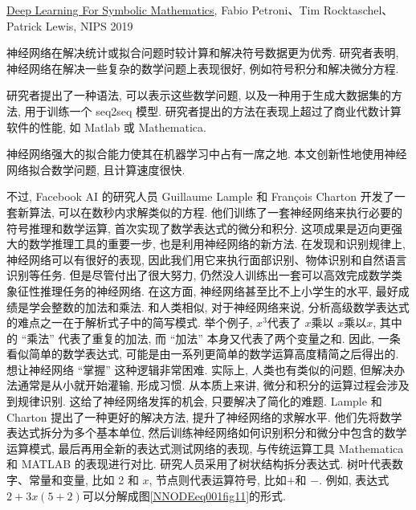 \href{https://openreview.net/forum?id=S1eZYeHFDSeId=S1eZYeHFDS}{Deep Learning For Symbolic Mathematics},  Fabio Petroni、Tim Rocktaschel、Patrick Lewis,  NIPS 2019

神经网络在解决统计或拟合问题时较计算和解决符号数据更为优秀. 研究者表明, 神经网络在解决一些复杂的数学问题上表现很好, 例如符号积分和解决微分方程.

研究者提出了一种语法, 可以表示这些数学问题, 以及一种用于生成大数据集的方法, 用于训练一个 seq2seq 模型. 研究者提出的方法在表现上超过了商业代数计算软件的性能, 如 Matlab 或 Mathematica.

神经网络强大的拟合能力使其在机器学习中占有一席之地. 本文创新性地使用神经网络拟合数学问题, 且计算速度很快.

不过, Facebook AI 的研究人员 Guillaume Lample 和 François Charton 开发了一套新算法, 可以在数秒内求解类似的方程. 他们训练了一套神经网络来执行必要的符号推理和数学运算, 首次实现了数学表达式的微分和积分.
这项成果是迈向更强大的数学推理工具的重要一步, 也是利用神经网络的新方法.
在发现和识别规律上, 神经网络可以有很好的表现, 因此我们用它来执行面部识别、物体识别和自然语言识别等任务.
但是尽管付出了很大努力, 仍然没人训练出一套可以高效完成数学类象征性推理任务的神经网络. 在这方面, 神经网络甚至比不上小学生的水平, 最好成绩是学会整数的加法和乘法.
和人类相似, 对于神经网络来说, 分析高级数学表达式的难点之一在于解析式子中的简写模式. 举个例子, $x^3$代表了 $x$乘以 $x$乘以$x$, 其中的 “乘法” 代表了重复的加法, 而 “加法” 本身又代表了两个变量之和.
因此, 一条看似简单的数学表达式, 可能是由一系列更简单的数学运算高度精简之后得出的.
想让神经网络 “掌握” 这种逻辑非常困难. 实际上, 人类也有类似的问题, 但解决办法通常是从小就开始灌输, 形成习惯.
从本质上来讲, 微分和积分的运算过程会涉及到规律识别. 这给了神经网络发挥的机会, 只要解决了简化的难题.
Lample 和 Charton 提出了一种更好的解决方法, 提升了神经网络的求解水平.
他们先将数学表达式拆分为多个基本单位, 然后训练神经网络如何识别积分和微分中包含的数学运算模式, 最后再用全新的表达式测试网络的表现, 与传统运算工具 Mathematica 和 MATLAB 的表现进行对比.
研究人员采用了树状结构拆分表达式. 树叶代表数字、常量和变量, 比如 2 和 $x$, 节点则代表运算符号, 比如$+$和 $-$.
例如, 表达式 $2 + 3 x (5+2)$可以分解成图\ref{NNODEeq001fig11}的形式.
